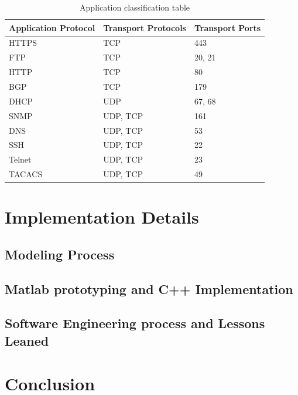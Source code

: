 \begin{table}[]
\centering
\caption{Application classification table}
\label{my-label}
\begin{tabular}{lll}
\hline
Application Protocol & Transport Protocols & Transport Ports \\ \hline
HTTPS               & TCP                & 443             \\
FTP                 & TCP                & 20, 21          \\
HTTP                & TCP                & 80              \\
BGP                 & TCP                & 179             \\
DHCP                & UDP                & 67, 68          \\
SNMP                & UDP, TCP           & 161             \\
DNS                 & UDP, TCP           & 53              \\
SSH                 & UDP, TCP           & 22              \\
Telnet              & UDP, TCP           & 23              \\
TACACS              & UDP, TCP           & 49              \\ \hline
\end{tabular}
\end{table}




\section{Implementation Details}

\subsection{Modeling Process}

\subsection{Matlab prototyping and C++ Implementation}

\subsection{Software Engineering process and Lessons Leaned}

\section{Conclusion}

